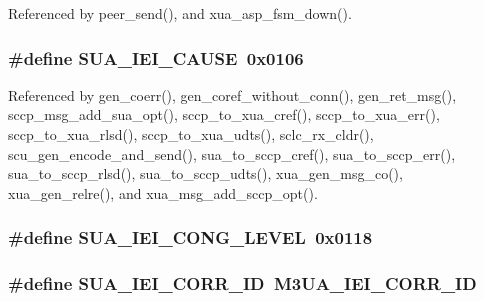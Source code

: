 Referenced by peer\+\_\+send(), and xua\+\_\+asp\+\_\+fsm\+\_\+down().

\subsubsection[{S\+U\+A\+\_\+\+I\+E\+I\+\_\+\+C\+A\+U\+SE}]{\setlength{\rightskip}{0pt plus 5cm}\#define S\+U\+A\+\_\+\+I\+E\+I\+\_\+\+C\+A\+U\+SE~0x0106}\label{sua_8h_a408727bcbd3e6f78e97c6c23bd0be498}


Referenced by gen\+\_\+coerr(), gen\+\_\+coref\+\_\+without\+\_\+conn(), gen\+\_\+ret\+\_\+msg(), sccp\+\_\+msg\+\_\+add\+\_\+sua\+\_\+opt(), sccp\+\_\+to\+\_\+xua\+\_\+cref(), sccp\+\_\+to\+\_\+xua\+\_\+err(), sccp\+\_\+to\+\_\+xua\+\_\+rlsd(), sccp\+\_\+to\+\_\+xua\+\_\+udts(), sclc\+\_\+rx\+\_\+cldr(), scu\+\_\+gen\+\_\+encode\+\_\+and\+\_\+send(), sua\+\_\+to\+\_\+sccp\+\_\+cref(), sua\+\_\+to\+\_\+sccp\+\_\+err(), sua\+\_\+to\+\_\+sccp\+\_\+rlsd(), sua\+\_\+to\+\_\+sccp\+\_\+udts(), xua\+\_\+gen\+\_\+msg\+\_\+co(), xua\+\_\+gen\+\_\+relre(), and xua\+\_\+msg\+\_\+add\+\_\+sccp\+\_\+opt().

\subsubsection[{S\+U\+A\+\_\+\+I\+E\+I\+\_\+\+C\+O\+N\+G\+\_\+\+L\+E\+V\+EL}]{\setlength{\rightskip}{0pt plus 5cm}\#define S\+U\+A\+\_\+\+I\+E\+I\+\_\+\+C\+O\+N\+G\+\_\+\+L\+E\+V\+EL~0x0118}\label{sua_8h_a164be897273219a40b99a83421201d70}
\subsubsection[{S\+U\+A\+\_\+\+I\+E\+I\+\_\+\+C\+O\+R\+R\+\_\+\+ID}]{\setlength{\rightskip}{0pt plus 5cm}\#define S\+U\+A\+\_\+\+I\+E\+I\+\_\+\+C\+O\+R\+R\+\_\+\+ID~{\bf M3\+U\+A\+\_\+\+I\+E\+I\+\_\+\+C\+O\+R\+R\+\_\+\+ID}}\label{sua_8h_ac4373f833fee1fd145dfc8e94aeb1420}


